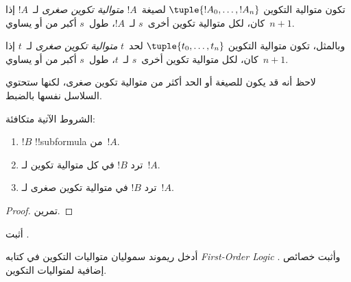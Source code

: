 \documentclass[../../../include/open-logic-section]{subfiles}
\begin{document}
\begin{defn}
تكون متوالية التكوين $\tuple{!A_0, \ldots, !A_n}$ لصيغة~$!A$
\emph{متوالية تكوين صغرى} لـ~$!A$ إذا كان، لكل متوالية تكوين
أخرى~$s$ لـ~$!A$، طول~$s$ أكبر من أو يساوي~$n+1$.

وبالمثل، تكون متوالية التكوين $\tuple{t_0, \ldots, t_n}$
لحد~$t$ \emph{متوالية تكوين صغرى} لـ~$t$ إذا كان، لكل متوالية
تكوين أخرى~$s$ لـ~$t$، طول~$s$ أكبر من أو يساوي~$n+1$.
\end{defn}

لاحظ أنه قد يكون للصيغة أو الحد أكثر من متوالية تكوين صغرى، لكنها ستحتوي
السلاسل نفسها بالضبط.

\begin{prop}
الشروط الآتية متكافئة:
\begin{enumerate}
    \item $!B$ !!{subformula} من~$!A$.
    \item ترد $!B$ في كل متوالية تكوين لـ~$!A$.
    \item ترد $!B$ في متوالية تكوين صغرى لـ~$!A$.
\end{enumerate}
\end{prop}

\begin{proof}
تمرين.
\end{proof}

\begin{prob}
أثبت .
\end{prob}

\begin{history}
أدخل ريموند سموليان متواليات التكوين في كتابه
\emph{First-Order Logic} \citep{Smullyan1968}.
وأثبت \citet{Zuckerman1973} خصائص إضافية لمتواليات التكوين.
\end{history}
\end{document}
